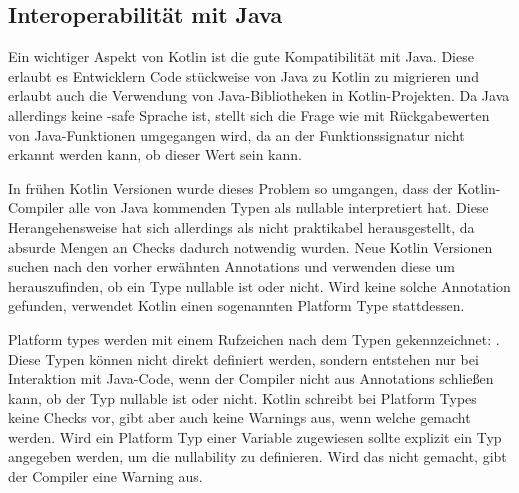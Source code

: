 \subsection{Interoperabilität mit Java}
Ein wichtiger Aspekt von Kotlin ist die gute Kompatibilität mit Java.
Diese erlaubt es Entwicklern Code stückweise von Java zu Kotlin zu migrieren und erlaubt auch die Verwendung von
Java-Bibliotheken in Kotlin-Projekten.
Da Java allerdings keine -safe Sprache ist, stellt sich die Frage wie mit Rückgabewerten von
Java-Funktionen umgegangen wird, da an der Funktionssignatur nicht erkannt werden kann, ob dieser Wert
 sein kann.

In frühen Kotlin Versionen wurde dieses Problem so umgangen, dass der Kotlin-Compiler alle von Java kommenden Typen als
nullable interpretiert hat.
Diese Herangehensweise hat sich allerdings als nicht praktikabel herausgestellt, da absurde Mengen an 
Checks dadurch notwendig wurden.
Neue Kotlin Versionen suchen nach den vorher erwähnten Annotations und verwenden diese um herauszufinden, ob ein Type
nullable ist oder nicht.
Wird keine solche Annotation gefunden, verwendet Kotlin einen sogenannten Platform Type stattdessen.\cite{kdocNullInterop,kblogNullSafety}

Platform types werden mit einem Rufzeichen nach dem Typen gekennzeichnet: .
Diese Typen können nicht direkt definiert werden, sondern entstehen nur bei Interaktion mit Java-Code, wenn der Compiler
nicht aus Annotations schließen kann, ob der Typ nullable ist oder nicht.
Kotlin schreibt bei Platform Types keine  Checks vor, gibt aber auch keine Warnings aus, wenn
welche gemacht werden.
Wird ein Platform Typ einer Variable zugewiesen sollte explizit ein Typ angegeben werden, um die nullability zu
definieren.
Wird das nicht gemacht, gibt der Compiler eine Warning aus.\cite{kdocNullInterop}

\renewcommand{\kapitelautor}{}
